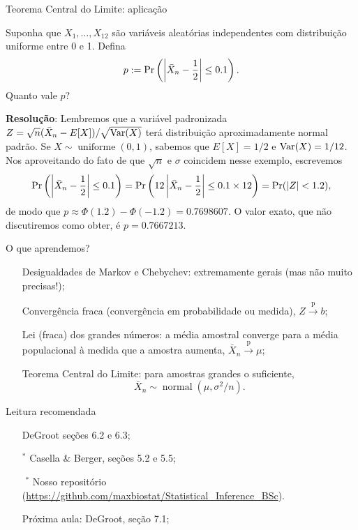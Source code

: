 \begin{frame}{Teorema Central do Limite: aplicação}
\begin{pergunta}
Suponha que $X_1, \ldots, X_{12}$ são variáveis aleatórias independentes com distribuição uniforme entre 0 e 1.
Defina
$$  p:=  \operatorname{Pr}\left(\left| \bar{X}_n - \frac{1}{2}\right| \leq 0.1\right).$$
Quanto vale $p$?
\end{pergunta}
\textbf{Resolução}: 
Lembremos que a variável padronizada $Z = \sqrt{n}(\bar{X}_n-E[X])/\sqrt{\operatorname{Var}(X)}$ terá distribuição aproximadamente normal padrão.
Se $X\sim \operatorname{uniforme}(0, 1)$, sabemos que $E[X] = 1/2$ e $\operatorname{Var}(X) = 1/12$.
Nos aproveitando do fato de que $\sqrt{n}$ e $\sigma$ coincidem nesse exemplo, escrevemos
$$\operatorname{Pr}\left(\left| \bar{X}_n - \frac{1}{2}\right| \leq 0.1\right) =  \operatorname{Pr}\left(12\left| \bar{X}_n - \frac{1}{2}\right| \leq 0.1\times 12\right) = \operatorname{Pr}(|Z| < 1.2),$$
de modo que $p \approx \Phi(1.2)-\Phi(-1.2) = 0.7698607$.
O valor exato, que não discutiremos como obter, é $p = 0.7667213$.
\end{frame}
\begin{frame}{O que aprendemos?}
\begin{itemize}
\item[\faLightbulbO] Desigualdades de Markov e Chebychev: extremamente gerais (mas não muito precisas!);
\item[\faLightbulbO] Convergência fraca (convergência em probabilidade ou medida), $Z \xrightarrow{\text{p}} b$;
\item[\faLightbulbO] Lei (fraca) dos grandes números: a média amostral converge para a média populacional à medida que a amostra aumenta, $\bar{X}_n \xrightarrow{\text{p}} \mu$;
\item[\faLightbulbO] Teorema Central do Limite: para amostras grandes o suficiente, 
$$\bar{X}_n \sim \operatorname{normal}(\mu, \sigma^2/n).$$
\end{itemize} 
\end{frame}
\begin{frame}{Leitura recomendada}
\begin{itemize}
 \item[\faBook] DeGroot seções 6.2 e 6.3;
 \item[\faBook] $^\ast$ Casella \& Berger, seções 5.2 e 5.5;
 \item[\faGithub] $^\ast$ Nosso repositório (\url{https://github.com/maxbiostat/Statistical_Inference_BSc}).
  \item[\faForward] Próxima aula: DeGroot, seção 7.1;
  \end{itemize} 
\end{frame}
